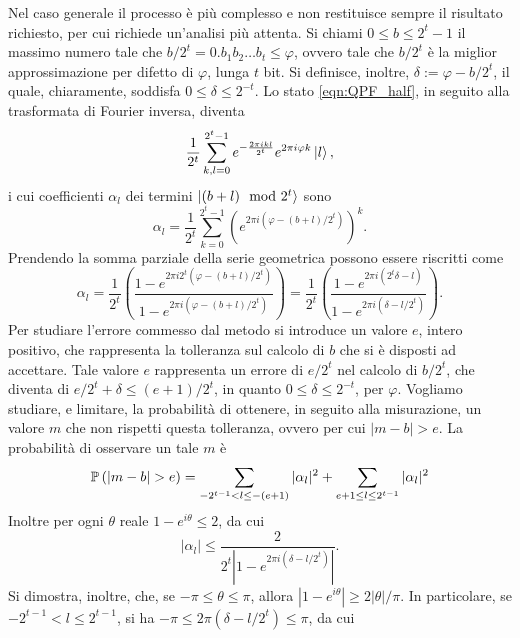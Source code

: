 Nel caso generale il processo è più complesso e non restituisce sempre il risultato richiesto, per cui richiede un'analisi più attenta.
Si chiami $0 \leq b \leq 2^t -1$ il massimo numero tale che $b/2^t = 0.b_1b_2\dots b_t \leq \varphi$, ovvero tale che $b/2^t$ è la miglior approssimazione per difetto di $\varphi$, lunga $t$ bit. 
Si definisce, inoltre, $\delta := \varphi - b/2^t$, il quale, chiaramente, soddisfa $0 \leq \delta \leq 2^{-t}$.
Lo stato \eqref{eqn:QPF_half}, in seguito alla trasformata di Fourier inversa, diventa
\begin{equation}
 \frac{1}{2^t} \sum_{k,l = 0}^{2^t-1} e^{-\frac{2 \pi i k l}{2^t}} e^{2 \pi i \varphi k} \ket{l},
\end{equation}
i cui coefficienti $\alpha_l$ dei termini $\ket{(b + l) \mod 2^t}$ sono
\begin{equation}
 \alpha_l = \frac{1}{2^t} \sum_{k=0}^{2^t-1} \left(e^{2 \pi i \left(\varphi - (b+l)/2^t\right)}\right)^k.
\end{equation}
Prendendo la somma parziale della serie geometrica possono essere riscritti come
\begin{equation}\label{eqn:dirichlet_kernel}
 \alpha_l = \frac{1}{2^t} \left( \frac{1 - e^{2 \pi i 2^t \left(\varphi - (b+l)/2^t\right)}}{1 - e^{2 \pi i \left(\varphi - (b+l)/2^t\right)}} \right) =
 \frac{1}{2^t} \left( \frac{1 - e^{2 \pi i \left(2^t\delta - l\right)}}{1 - e^{2 \pi i \left(\delta - l/2^t\right)}} \right).
\end{equation}
Per studiare l'errore commesso dal metodo si introduce un valore $e$, intero positivo, che rappresenta la tolleranza sul calcolo di $b$ che si è disposti ad accettare.
Tale valore $e$ rappresenta un errore di $e/2^t$ nel calcolo di $b/2^t$, che diventa di $e/2^t + \delta \leq (e+1)/2^t$, in quanto $0 \leq \delta \leq 2^{-t}$, per $\varphi$.
Vogliamo studiare, e limitare, la probabilità di ottenere, in seguito alla misurazione, un valore $m$ che non rispetti questa tolleranza, ovvero per cui $|m-b| > e$. 
La probabilità di osservare un tale $m$ è
\begin{equation}\label{eqn:QPF_prob_defn}
 \P\left( |m-b| > e \right) =
 \sum_{-2^{t-1}<l \leq -(e+1)} |\alpha_l|^2 + \sum_{e+1 \leq l \leq 2^{t-1}} |\alpha_l|^2
\end{equation}
Inoltre per ogni $\theta$ reale $1 - e^{i\theta} \leq 2$, da cui
\begin{equation}
 |\alpha_l| \leq \frac{2}{2^t \left| 1-e^{2 \pi i (\delta -l/2^t)} \right|}.
\end{equation}
Si dimostra, inoltre, che, se $-\pi \leq \theta \leq \pi$, allora $\left| 1-e^{i\theta}\right| \geq 2 |\theta|/\pi$. In particolare, se $-2^{t-1} < l \leq 2^{t-1}$, si ha $-\pi \leq 2\pi (\delta - l/2^t) \leq \pi$, da cui

